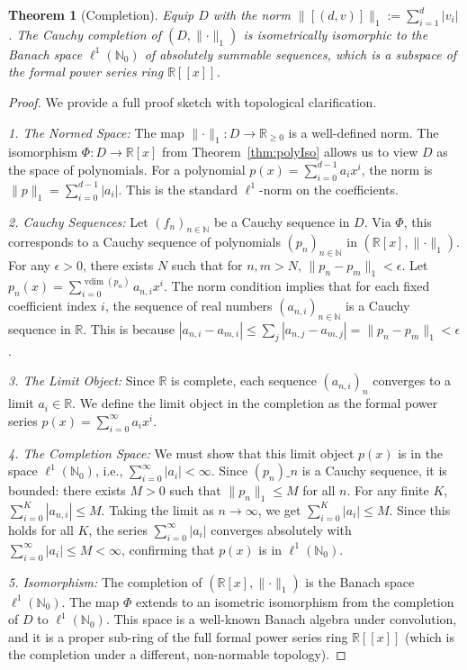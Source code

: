 \documentclass[11pt]{article}
\newtheorem{theorem}{Theorem}[section]
\newcommand{\vdim}{\operatorname{vdim}}
\begin{document}
\begin{theorem}[Completion]\label{thm:completion}
Equip \(D\) with the norm \(\lVert[(d,v)]\rVert_1:=\sum_{i=1}^{d}|v_i|\). The Cauchy completion of \((D, \lVert \cdot \rVert_1)\) is isometrically isomorphic to the Banach space \(\ell^1(\mathbb{N}_0)\) of absolutely summable sequences, which is a subspace of the formal power series ring \(\mathbb R[[x]]\).
\end{theorem}
\begin{proof}
We provide a full proof sketch with topological clarification.

\textit{1. The Normed Space:} The map \(\lVert \cdot \rVert_1: D \to \mathbb{R}_{\ge 0}\) is a well-defined norm. The isomorphism \(\Phi: D \to \mathbb{R}[x]\) from Theorem~\ref{thm:polyIso} allows us to view \(D\) as the space of polynomials. For a polynomial \(p(x) = \sum_{i=0}^{d-1} a_i x^i\), the norm is \(\lVert p \rVert_1 = \sum_{i=0}^{d-1} |a_i|\). This is the standard \(\ell^1\)-norm on the coefficients.

\textit{2. Cauchy Sequences:} Let \((f_n)_{n \in \mathbb{N}}\) be a Cauchy sequence in \(D\). Via \(\Phi\), this corresponds to a Cauchy sequence of polynomials \((p_n)_{n \in \mathbb{N}}\) in \((\mathbb{R}[x], \lVert \cdot \rVert_1)\). For any \(\epsilon > 0\), there exists \(N\) such that for \(n,m > N\), \(\lVert p_n - p_m \rVert_1 < \epsilon\).
Let \(p_n(x) = \sum_{i=0}^{\vdim(p_n)} a_{n,i} x^i\). The norm condition implies that for each fixed coefficient index \(i\), the sequence of real numbers \((a_{n,i})_{n \in \mathbb{N}}\) is a Cauchy sequence in \(\mathbb{R}\). This is because \(|a_{n,i} - a_{m,i}| \le \sum_j |a_{n,j} - a_{m,j}| = \lVert p_n - p_m \rVert_1 < \epsilon\).

\textit{3. The Limit Object:} Since \(\mathbb{R}\) is complete, each sequence \((a_{n,i})_n\) converges to a limit \(a_i \in \mathbb{R}\). We define the limit object in the completion as the formal power series \(p(x) = \sum_{i=0}^{\infty} a_i x^i\).

\textit{4. The Completion Space:} We must show that this limit object \(p(x)\) is in the space \(\ell^1(\mathbb{N}_0)\), i.e., \(\sum_{i=0}^{\infty} |a_i| < \infty\).
Since \((p_n)\_n\) is a Cauchy sequence, it is bounded: there exists \(M > 0\) such that \(\lVert p_n \rVert_1 \le M\) for all \(n\). For any finite \(K\), \(\sum_{i=0}^K |a_{n,i}| \le M\). Taking the limit as \(n \to \infty\), we get \(\sum_{i=0}^K |a_i| \le M\). Since this holds for all \(K\), the series \(\sum_{i=0}^{\infty} |a_i|\) converges absolutely with \(\sum_{i=0}^{\infty} |a_i| \le M < \infty\), confirming that \(p(x)\) is in \(\ell^1(\mathbb{N}_0)\).

\textit{5. Isomorphism:} The completion of \((\mathbb{R}[x], \lVert \cdot \rVert_1)\) is the Banach space \(\ell^1(\mathbb{N}_0)\). The map \(\Phi\) extends to an isometric isomorphism from the completion of \(D\) to \(\ell^1(\mathbb{N}_0)\). This space is a well-known Banach algebra under convolution, and it is a proper sub-ring of the full formal power series ring \(\mathbb R[[x]]\) (which is the completion under a different, non-normable topology).
\end{proof}
\end{document}
